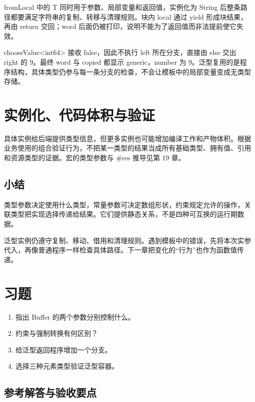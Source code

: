 fromLocal 中的 T 同时用于参数、局部变量和返回值，实例化为 String 后整条路径都要满足字符串的复制、转移与清理规则。块内 local 通过 yield 形成块结果，再由 return 交回；word 后面仍被打印，说明不能为了返回值而非法提前使它失效。

chooseValue<int64> 接收 false，因此不执行 left 所在分支，直接由 else 交出 right 的 9。最终 word 与 copied 都显示 generic，number 为 9。泛型复用的是程序结构，具体类型仍参与每一条分支的检查，不会让模板中的局部变量变成无类型存储。

\section{实例化、代码体积与验证}

具体实例给后端提供类型信息，但更多实例也可能增加编译工作和产物体积。根据业务使用的组合验证行为，不把某一类型的结果当成所有基础类型、拥有值、引用和资源类型的证据。宏的类型参数与 \#res 推导见第 19 章。

\subsection*{小结}

类型参数决定使用什么类型，常量参数可决定数组形状，约束规定允许的操作，关联类型把实现选择传递给结果。它们提供静态关系，不是四种可互换的运行期数据。

泛型实例仍遵守复制、移动、借用和清理规则。遇到模板中的错误，先将本次实参代入，再像普通程序一样检查具体路径。下一章把变化的“行为”也作为函数值传递。

\section{习题}

\begin{enumerate}

\item 指出 Buffer 的两个参数分别控制什么。

\item 约束与强制转换有何区别？

\item 给泛型返回程序增加一个分支。

\item 选择三种元素类型验证泛型容器。

\end{enumerate}

\subsection*{参考解答与验收要点}

